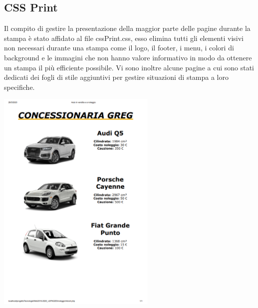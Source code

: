     \subsection{CSS Print}
        Il compito di gestire la presentazione della maggior parte delle pagine durante la stampa è stato affidato al file cssPrint.css, esso elimina tutti gli elementi visivi non necessari durante una stampa come il logo, il footer, i menu, i colori di background e le immagini che non hanno valore informativo in modo da ottenere un stampa il più efficiente possibile.
        Vi sono inoltre alcune pagine a cui sono stati dedicati dei fogli di stile aggiuntivi per gestire situazioni di stampa a loro specifiche.

    \begin{center}
        \includegraphics[width=18pc]{./img/StampaVeicoliNoleggio.png}
    \end{center}

\pagebreak